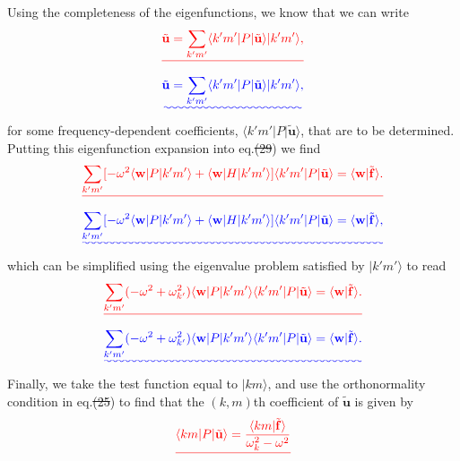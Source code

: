 \documentclass[a4paper,12pt]{paper}
\providecommand{\DIFadd}[1]{{\protect\color{blue}\uwave{#1}}} %
\providecommand{\DIFdel}[1]{{\protect\color{red}\sout{#1}}}                      %
\providecommand{\DIFaddbegin}{} %
\providecommand{\DIFaddend}{} %
\providecommand{\DIFdelbegin}{} %
\providecommand{\DIFdelend}{} %
\begin{document}
Using the completeness of the eigenfunctions, we know that we can write
\DIFdelbegin \begin{displaymath}
\DIFdel{\tilde{\mathbf{u}}=\sum_{k'm'}\langle k'm'|P|\tilde{\mathbf{u}}\rangle|k'm'\rangle ,
}\end{displaymath}%
\DIFdelend \DIFaddbegin \begin{equation}
\DIFadd{\tilde{\mathbf{u}}=\sum_{k'm'}\langle k'm'|P|\tilde{\mathbf{u}}\rangle|k'm'\rangle,
\label{eq:30}
}\end{equation}\DIFaddend 
for some frequency-dependent coefficients, $\langle k'm'|P|\tilde{\mathbf{u}}\rangle$, that are to be determined. Putting this eigenfunction expansion into eq.\DIFdelbegin \DIFdel{(29}\DIFdelend \DIFaddbegin \DIFadd{~(\ref{eq:29}}\DIFaddend ) we find
\DIFdelbegin \begin{displaymath}
\DIFdel{\sum_{k'm'}[-\omega^{2}\langle \mathbf{w}|P|k'm'\rangle+\langle \mathbf{w}|H|k'm'\rangle]\langle k'm'|P|\tilde{\mathbf{u}}\rangle=\langle \mathbf{w}|\tilde{\mathbf{f}}\rangle.
}\end{displaymath}%
\DIFdelend \DIFaddbegin \begin{equation}
\DIFadd{\sum_{k'm'}[-\omega^{2}\langle \mathbf{w}|P|k'm'\rangle+\langle \mathbf{w}|H|k'm'\rangle]\langle k'm'|P|\tilde{\mathbf{u}}\rangle=\langle \mathbf{w}|\tilde{\mathbf{f}}\rangle,
\label{eq:31}
}\end{equation}\DIFaddend 
which can be simplified using the eigenvalue problem satisfied by $|k'm'\rangle$ to read
\DIFdelbegin \begin{displaymath}
\DIFdel{\sum_{k'm'}(-\omega^{2}+\omega_{k'}^{2})\langle \mathbf{w}|P|k'm'\rangle\langle k'm'|P|\tilde{\mathbf{u}}\rangle=\langle \mathbf{w}|\tilde{\mathbf{f}}\rangle .
}\end{displaymath}%
\DIFdelend \DIFaddbegin \begin{equation}
\DIFadd{\sum_{k'm'}(-\omega^{2}+\omega_{k'}^{2})\langle \mathbf{w}|P|k'm'\rangle\langle k'm'|P|\tilde{\mathbf{u}}\rangle=\langle \mathbf{w}|\tilde{\mathbf{f}}\rangle.
\label{eq:32}
}\end{equation}\DIFaddend 
Finally, we take the test function equal to $|km\rangle$, and use the orthonormality condition in eq.\DIFdelbegin \DIFdel{(25}\DIFdelend \DIFaddbegin \DIFadd{~(\ref{eq:25}}\DIFaddend ) to find that the $(k,m)$th coefficient of $\tilde{\mathbf{u}}$ is given by
\DIFdelbegin \begin{displaymath}
\DIFdel{\langle km|P|\tilde{\mathbf{u}}\rangle=\frac{\langle km|\tilde{\mathbf{f}}\rangle}{\omega_{k}^{2}-\omega^{2}}
}\end{displaymath}%
\end{document}
